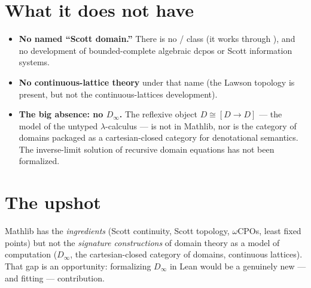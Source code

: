 \documentclass[11pt]{article}
\begin{document}
\section*{What it does not have}
\begin{itemize}
  \item \textbf{No named ``Scott domain.''} There is no
    / class (it works through
    ), and no development of bounded-complete
    algebraic dcpos or Scott information systems.
  \item \textbf{No continuous-lattice theory} under that name (the Lawson
    topology is present, but not the continuous-lattices development).
  \item \textbf{The big absence: no $D_\infty$.} The reflexive object
    $D \cong [D \to D]$ --- the model of the untyped $\lambda$-calculus --- is
    not in Mathlib, nor is the category of domains packaged as a cartesian-closed
    category for denotational semantics. The inverse-limit solution of recursive
    domain equations has not been formalized.
\end{itemize}

\section*{The upshot}
Mathlib has the \emph{ingredients} (Scott continuity, Scott topology,
$\omega$CPOs, least fixed points) but not the \emph{signature constructions} of
domain theory as a model of computation ($D_\infty$, the cartesian-closed
category of domains, continuous lattices). That gap is an opportunity:
formalizing $D_\infty$ in Lean would be a genuinely new --- and fitting ---
contribution.
\end{document}
